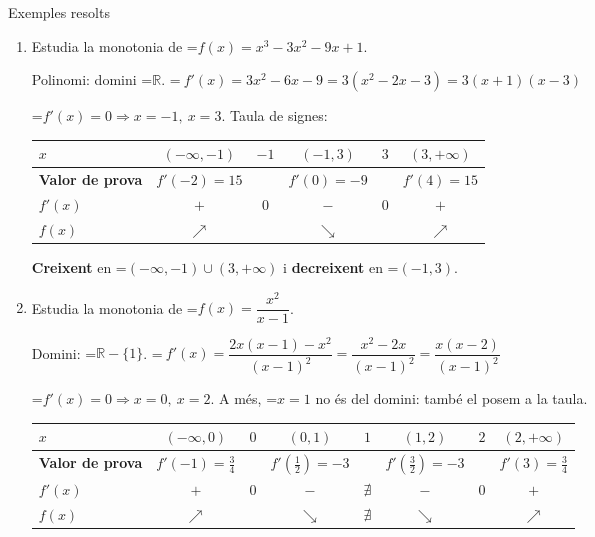 \documentclass[11pt,a4paper]{article}
\newcommand{\fmm}[1]{\setbox0=\hbox{$#1$}\ifdim\wd0>\linewidth\[#1\]\else\mbox{\box0}\fi}
\begin{document}
  
\begin{fmex}{Exemples resolts}
\begin{enumerate}[label=\textbf{\arabic*.},leftmargin=*]
\item Estudia la monotonia de \fmm{f(x)=x^3-3x^2-9x+1}.
          

            

Polinomi: domini \fmm{\mathbb R}. \fmm{\ f'(x)=3x^2-6x-9=3(x^2-2x-3)=3(x+1)(x-3)}

            

\fmm{f'(x)=0\Rightarrow x=-1,\ x=3}. Taula de signes:

              
\begin{center}\small\renewcommand{\arraystretch}{1.6}\begin{tabular}{l|ccccc}\toprule
\textbf{$x$} & $(-\infty,-1)$ & $-1$ & $(-1,3)$ & $3$ & $(3,+\infty)$\\\midrule
\textbf{Valor de prova} & $f'(-2)=15$ &  & $f'(0)=-9$ &  & $f'(4)=15$\\\midrule
\textbf{$f'(x)$} & \textbf{\color{fmok}$+$} & 0 & \textbf{\color{fmas}$-$} & 0 & \textbf{\color{fmok}$+$}\\\midrule
\textbf{$f(x)$} & {\Large\color{fmok}$\nearrow$} &  & {\Large\color{fmas}$\searrow$} &  & {\Large\color{fmok}$\nearrow$}\\
\bottomrule\end{tabular}\end{center}

            

\textbf{Creixent} en \fmm{(-\infty,-1)\cup(3,+\infty)} i \textbf{decreixent} en \fmm{(-1,3)}.
\item Estudia la monotonia de \fmm{f(x)=\dfrac{x^2}{x-1}}.
          

            

Domini: \fmm{\mathbb R-\{1\}}. \fmm{\ f'(x)=\dfrac{2x(x-1)-x^2}{(x-1)^2}=\dfrac{x^2-2x}{(x-1)^2}=\dfrac{x(x-2)}{(x-1)^2}}

            

\fmm{f'(x)=0\Rightarrow x=0,\ x=2}. A més, \fmm{x=1} no és del domini: també el posem a la taula.

              
\begin{center}\small\renewcommand{\arraystretch}{1.6}\begin{tabular}{l|ccccccc}\toprule
\textbf{$x$} & $(-\infty,0)$ & $0$ & $(0,1)$ & $1$ & $(1,2)$ & $2$ & $(2,+\infty)$\\\midrule
\textbf{Valor de prova} & $f'(-1)=\frac34$ &  & $f'(\frac12)=-3$ &  & $f'(\frac32)=-3$ &  & $f'(3)=\frac34$\\\midrule
\textbf{$f'(x)$} & \textbf{\color{fmok}$+$} & 0 & \textbf{\color{fmas}$-$} & $\nexists$ & \textbf{\color{fmas}$-$} & 0 & \textbf{\color{fmok}$+$}\\\midrule
\textbf{$f(x)$} & {\Large\color{fmok}$\nearrow$} &  & {\Large\color{fmas}$\searrow$} & $\nexists$ & {\Large\color{fmas}$\searrow$} &  & {\Large\color{fmok}$\nearrow$}\\
\bottomrule\end{tabular}\end{center}


\end{enumerate}
\end{fmex}
\end{document}
